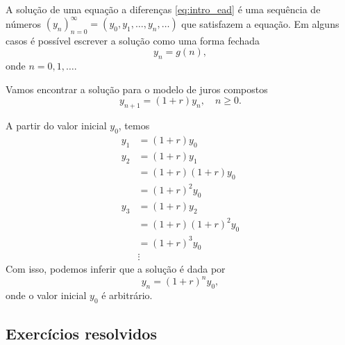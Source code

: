 A solução de uma equação a diferenças \eqref{eq:intro_ead} é uma sequência de números $(y_n)_{n=0}^\infty = (y_0, y_1, \dotsc, y_n, \ldots)$ que satisfazem a equação. Em alguns casos é possível escrever a solução como uma forma fechada
\begin{equation}
  y_n = g(n),
\end{equation}
onde $n = 0, 1, \ldots$.

\begin{ex}
  Vamos encontrar a solução para o modelo de juros compostos
  \begin{equation}
    y_{n+1} = (1+r)y_n,\quad n\geq 0.
  \end{equation}

  A partir do valor inicial $y_0$, temos
  \begin{align}
    y_1 &= (1+r)y_0\\
    y_2 &= (1+r)y_1\\
        &= (1+r)(1+r)y_0\\
        &= (1+r)^2y_0 \\
    y_3 &= (1+r)y_2\\
        &= (1+r)(1+r)^2y_0\\
        &= (1+r)^3y_0\\
        &\vdots
  \end{align}
  Com isso, podemos inferir que a solução é dada por
  \begin{equation}
    y_n = (1+r)^ny_0,
  \end{equation}
  onde o valor inicial $y_0$ é arbitrário.
\end{ex}

\subsection*{Exercícios resolvidos}

